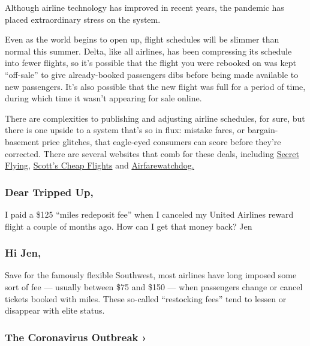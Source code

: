 Although airline technology has improved in recent years, the pandemic
has placed extraordinary stress on the system.

Even as the world begins to open up, flight schedules will be slimmer
than normal this summer. Delta, like all airlines, has been compressing
its schedule into fewer flights, so it's possible that the flight you
were rebooked on was kept ``off-sale'' to give already-booked passengers
dibs before being made available to new passengers. It's also possible
that the new flight was full for a period of time, during which time it
wasn't appearing for sale online.

There are complexities to publishing and adjusting airline schedules,
for sure, but there is one upside to a system that's so in flux: mistake
fares, or bargain-basement price glitches, that eagle-eyed consumers can
score before they're corrected. There are several websites that comb for
these deals, including \href{https://www.secretflying.com/}{Secret
Flying,} \href{https://scottscheapflights.com/}{Scott's Cheap Flights}
and \href{https://www.airfarewatchdog.com/}{Airfarewatchdog.}

\hypertarget{dear-tripped-up-2}{%
\subsubsection{\texorpdfstring{\textbf{Dear Tripped
Up,}}{Dear Tripped Up,}}\label{dear-tripped-up-2}}

I paid a \$125 ``miles redeposit fee'' when I canceled my United
Airlines reward flight a couple of months ago. How can I get that money
back? Jen

\hypertarget{hi-jen}{%
\subsubsection{Hi Jen,}\label{hi-jen}}

Save for the famously flexible Southwest, most airlines have long
imposed some sort of fee --- usually between \$75 and \$150 --- when
passengers change or cancel tickets booked with miles. These so-called
``restocking fees'' tend to lessen or disappear with elite status.

\href{https://www.nytimes3xbfgragh.onion/news-event/coronavirus?action=click\&pgtype=Article\&state=default\&region=MAIN_CONTENT_3\&context=storylines_faq}{}

\hypertarget{the-coronavirus-outbreak-}{%
\subsubsection{The Coronavirus Outbreak
›}\label{the-coronavirus-outbreak-}}


